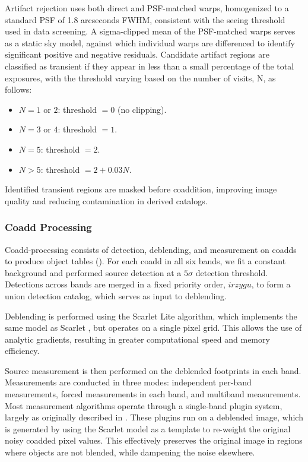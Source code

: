 Artifact rejection uses both direct and PSF-matched warps, homogenized to a standard PSF of 1.8 arcseconds FWHM,  consistent with the seeing threshold used in data screening.
A sigma-clipped mean of the PSF-matched warps serves as a static sky model, against which individual warps are differenced to identify significant positive and negative residuals.
Candidate artifact regions are classified as transient if they appear in less than a small percentage of the total exposures, with the threshold varying based on the number of visits, N,  as follows:
\begin{itemize}
    \item $N=1$ or $2$: threshold $= 0$ (no clipping).
    \item $N=3$ or $4$: threshold $= 1$.
    \item $N=5$: threshold $= 2$.
    \item $N>5$: threshold $= 2+0.03N$.
\end{itemize}
Identified transient regions are masked before coaddition, improving image quality and reducing contamination in derived catalogs.

\subsubsection{Coadd Processing}
\label{sssec:coadd_processing}
Coadd-processing consists of detection, deblending, and  measurement on coadds to produce object tables (). 
For each coadd in all six bands, we fit a constant background and performed source detection at a $5\sigma$ detection threshold. 
Detections across bands are merged in a fixed priority order, $irzygu$, to form a union detection catalog, which serves as input to deblending.

Deblending is performed using the Scarlet Lite algorithm, which implements the same model as Scarlet \citep{2018A&C....24..129M}, but operates on a single pixel grid. 
This allows the use of analytic gradients, resulting in greater computational speed and memory efficiency. 

Source measurement is then performed on the deblended footprints in each band.
Measurements are conducted in three modes: independent per-band measurements, forced measurements in each band, and multiband measurements. 
Most measurement algorithms operate through a single-band plugin system, largely as originally described in \citet{2018PASJ...70S...5B}. 
These plugins run on a deblended image, which is generated by using the Scarlet model as a template to re-weight the original noisy coadded pixel values.
This effectively preserves the original image in regions where objects are not blended, while dampening the noise elsewhere.

